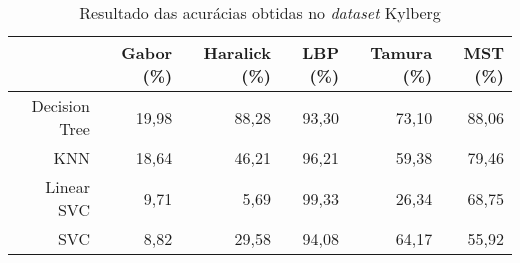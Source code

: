 \begin{table}[H]
    \centering
    \caption[Resultado das acurácias obtidas no \textit{dataset} Kylberg]{Resultado das acurácias obtidas no \textit{dataset} Kylberg
    \label{tab:kylbergAcuracias}}
    \begin{tabular}{rrrrrr}
        \toprule
            & Gabor (\%) & Haralick (\%) & LBP (\%) & Tamura (\%) & MST (\%) \\
        \midrule
            Decision Tree & 19,98 & 88,28 & 93,30 & 73,10 & 88,06 \\
            KNN & 18,64 & 46,21 & 96,21 & 59,38 & 79,46 \\
            Linear SVC & 9,71 & 5,69 & 99,33 & 26,34 & 68,75 \\
            SVC & 8,82 & 29,58 & 94,08 & 64,17 & 55,92 \\
        \bottomrule
    \end{tabular}
\end{table}
